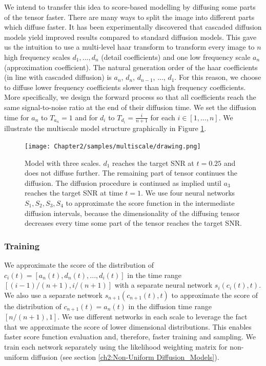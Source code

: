 We intend to transfer this idea to score-based modelling by diffusing some parts of the tensor faster. There are many ways to split the image into different parts which diffuse faster. It has been experimentally discovered that cascaded diffusion models \cite{saharia2021sr3} yield improved results  compared to standard diffusion models. This gave us the intuition to use a multi-level haar transform to transform every image to $n$ high frequency scales $d_1,...,d_n$ (detail coefficients) and one low frequency scale $a_n$ (approximation coefficient). The natural generation order of the haar coefficients (in line with cascaded diffusion) is $a_n$, $d_n$, $d_{n-1}$, ..., $d_1$. For this reason, we choose to diffuse lower frequency coefficients slower than high frequency coefficients. More specifically, we design the forward process so that all coefficients reach the same signal-to-noise ratio at the end of their diffusion time. We set the diffusion time for $a_n$ to $T_{a_n}=1$ and for $d_i$ to $T_{d_i}=\frac{i}{n+1}$ for each $i\in [1,...,n]$. We illustrate the multiscale model structure graphically in Figure \ref{ch2:fig:Multiscale_model}.

\begin{figure}[h]
    \centering
    \texttt{[image: Chapter2/samples/multiscale/drawing.png]}
    \caption{Model with three scales. $d_1$ reaches the target SNR at $t=0.25$ and does not diffuse further. The remaining part of tensor continues the diffusion. The diffusion procedure is continued as implied until $a_3$ reaches the target SNR at time $t=1$. We use four neural networks $S_1, S_2, S_3, S_4$ to approximate the score function in the intermediate diffusion intervals, because the dimensionality of the diffusing tensor decreases every time some part of the tensor reaches the target SNR.}
    \label{ch2:fig:Multiscale_model}
\end{figure}

\subsubsection{Training}
We approximate the score of the distribution of $c_i(t) = [a_n(t), d_n(t),...,d_i(t)]$ in the time range $[(i-1)/(n+1), i/(n+1)]$ with a separate neural network $s_i(c_i(t), t)$. We also use a separate network $s_{n+1}(c_{n+1}(t), t)$ to approximate the score of the distribution of $c_{n+1}(t)=a_n(t)$ in the diffusion time range $[n/(n+1), 1]$. We use different networks in each scale to leverage the fact that we approximate the score of lower dimensional distributions. This enables faster score function evaluation and, therefore, faster training and sampling. We train each network separately using the likelihood weighting matrix for non-uniform diffusion (see section \ref{ch2:Non-Uniform Diffusion_Models}).

